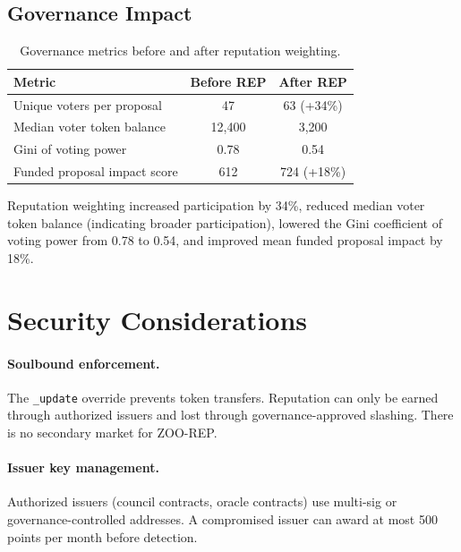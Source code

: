 \documentclass[11pt,letterpaper]{article}
\begin{document}
\subsection{Governance Impact}

\begin{table}[h]
\centering
\caption{Governance metrics before and after reputation weighting.}
\label{tab:impact}
\begin{tabular}{lcc}
\toprule
\textbf{Metric} & \textbf{Before REP} & \textbf{After REP} \\
\midrule
Unique voters per proposal & 47 & 63 (+34\%) \\
Median voter token balance & 12{,}400 & 3{,}200 \\
Gini of voting power & 0.78 & 0.54 \\
Funded proposal impact score & 612 & 724 (+18\%) \\
\bottomrule
\end{tabular}
\end{table}

Reputation weighting increased participation by 34\%, reduced median voter token balance (indicating broader participation), lowered the Gini coefficient of voting power from 0.78 to 0.54, and improved mean funded proposal impact by 18\%.

\section{Security Considerations}
\label{sec:security}

\paragraph{Soulbound enforcement.} The \texttt{\_update} override prevents token transfers. Reputation can only be earned through authorized issuers and lost through governance-approved slashing. There is no secondary market for ZOO-REP.

\paragraph{Issuer key management.} Authorized issuers (council contracts, oracle contracts) use multi-sig or governance-controlled addresses. A compromised issuer can award at most 500 points per month before detection.
\end{document}
